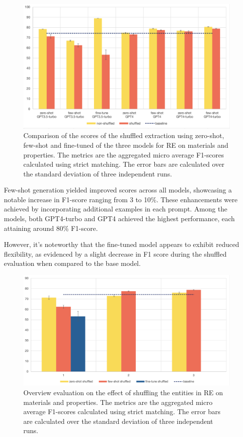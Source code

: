 \documentclass[a4paper]{article}
\begin{document}
\begin{figure}[htbp]
  \centering
  \includegraphics[width=1\textwidth]{figures/re-eval-all.png} 
  \caption{Comparison of the scores of the shuffled extraction using zero-shot, few-shot and fine-tuned of the three models for RE on materials and properties. The metrics are the aggregated micro average F1-scores calculated using strict matching. The error bars are calculated over the standard deviation of three independent runs.}
  \label{fig:re-eval-all}
\end{figure}

Few-shot generation yielded improved scores across all models, showcasing a notable increase in F1-score ranging from 3 to 10\%. These enhancements were achieved by incorporating additional examples in each prompt. Among the models, both GPT4-turbo and GPT4 achieved the highest performance, each attaining around 80\% F1-score.

However, it's noteworthy that the fine-tuned model appears to exhibit reduced flexibility, as evidenced by a slight decrease in F1 score during the shuffled evaluation when compared to the base model.


\begin{figure}[htbp]
  \centering
  \includegraphics[width=1\textwidth]{figures/re-eval-shuffled-all.png} 
  \caption{Overview evaluation on the effect of shuffling the entities in RE on materials and properties. The metrics are the aggregated micro average F1-scores calculated using strict matching. The error bars are calculated over the standard deviation of three independent runs.}
  \label{fig:re-eval-shuffled-all}
\end{figure}
\end{document}
